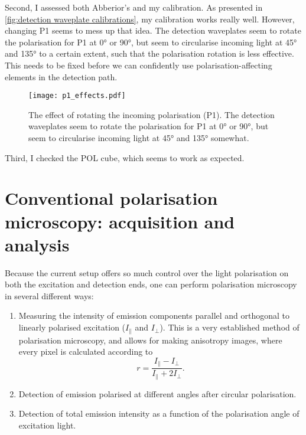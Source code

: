Second, I assessed both Abberior's and my calibration. As presented in \autoref{fig:detection waveplate calibrations}, my calibration works really well. However, changing P1 seems to mess up that idea. The detection waveplates seem to rotate the polarisation for P1 at \ang{0} or \ang{90}, but seem to circularise incoming light at \ang{45} and \ang{135} to a certain extent, such that the polarisation rotation is less effective. This needs to be fixed before we can confidently use polarisation-affecting elements in the detection path.

\begin{figure}[h]
	\centering
	\texttt{[image: p1\_effects.pdf]}
	\caption{
		The effect of rotating the incoming polarisation (P1). The detection waveplates seem to rotate the polarisation for P1 at \ang{0} or \ang{90}, but seem to circularise incoming light at \ang{45} and \ang{135} somewhat.
	}
	\label{fig:p1 effects}
\end{figure}

Third, I checked the POL cube, which seems to work as expected. 

\section{Conventional polarisation microscopy: acquisition and analysis}
\label{sec:pol analysis}
 
Because the current setup offers so much control over the light polarisation on both the excitation and detection ends, one can perform polarisation microscopy in several different ways:
\begin{enumerate}
	\item Measuring the intensity of emission components parallel and orthogonal to linearly polarised excitation ($ I_\parallel $ and $ I_\perp $). This is a very established method of polarisation microscopy, and allows for making anisotropy images, where every pixel is calculated according to
	\begin{equation}
		r=\frac{I_\parallel - I_\perp}{I_\parallel + 2I_\perp}.
	\end{equation}
	
	\item Detection of emission polarised at different angles after circular polarisation.
	
	\item Detection of total emission intensity as a function of the polarisation angle of excitation light.
\end{enumerate}


